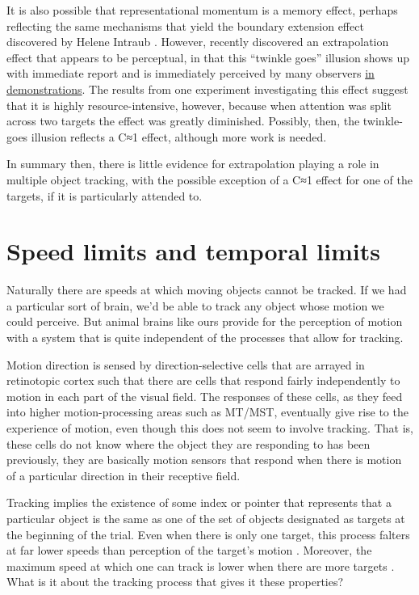 \documentclass[
]{book}
\begin{document}
It is also possible that representational momentum is a memory effect, perhaps reflecting the same mechanisms that yield the boundary extension effect discovered by Helene Intraub \citep{intraubBoundaryExtensionFundamental1993}. However, \citet{nakayamaDynamicNoiseBackground2021} recently discovered an extrapolation effect that appears to be perceptual, in that this ``twinkle goes'' illusion shows up with immediate report and is immediately perceived by many observers \href{https://twitter.com/ceptional/status/1204116417429131264}{in demonstrations}. The results from one experiment investigating this effect suggest that it is highly resource-intensive, however, because when attention was split across two targets the effect was greatly diminished. Possibly, then, the twinkle-goes illusion reflects a C≈1 effect, although more work is needed.

In summary then, there is little evidence for extrapolation playing a role in multiple object tracking, with the possible exception of a C≈1 effect for one of the targets, if it is particularly attended to.

\hypertarget{speedAndTime}{%
\chapter{Speed limits and temporal limits}\label{speedAndTime}}

Naturally there are speeds at which moving objects cannot be tracked. If we had a particular sort of brain, we'd be able to track any object whose motion we could perceive. But animal brains like ours provide for the perception of motion with a system that is quite independent of the processes that allow for tracking.

Motion direction is sensed by direction-selective cells that are arrayed in retinotopic cortex such that there are cells that respond fairly independently to motion in each part of the visual field. The responses of these cells, as they feed into higher motion-processing areas such as MT/MST, eventually give rise to the experience of motion, even though this does not seem to involve tracking. That is, these cells do not know where the object they are responding to has been previously, they are basically motion sensors that respond when there is motion of a particular direction in their receptive field.

Tracking implies the existence of some index or pointer that represents that a particular object is the same as one of the set of objects designated as targets at the beginning of the trial. Even when there is only one target, this process falters at far lower speeds than perception of the target's motion \citep{verstratenLimitsAttentiveTracking2000}. Moreover, the maximum speed at which one can track is lower when there are more targets \citep{holcombeExhaustingAttentionalTracking2012}. What is it about the tracking process that gives it these properties?
\end{document}
